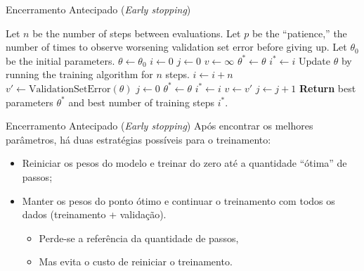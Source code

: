 \documentclass{beamer}
\begin{document}
\begin{frame}{Encerramento Antecipado (\textit{Early stopping})}
\begin{algorithm}[H]
\tiny
\begin{algorithmic}[1]
\STATE Let $n$ be the number of steps between evaluations.
\STATE Let $p$ be the ``patience,'' the number of times to observe worsening validation set error before giving up.
\STATE Let $\theta_0$ be the initial parameters.
\STATE $\theta \leftarrow \theta_0$
\STATE $i \leftarrow 0$
\STATE $j \leftarrow 0$
\STATE $v \leftarrow \infty$
\STATE $\theta^\ast \leftarrow \theta$
\STATE $i^\ast \leftarrow i$
    \STATE Update $\theta$ by running the training algorithm for $n$ steps.
    \STATE $i \leftarrow i + n$
    \STATE $v' \leftarrow \text{ValidationSetError}(\theta)$
        \STATE $j \leftarrow 0$
        \STATE $\theta^\ast \leftarrow \theta$
        \STATE $i^\ast \leftarrow i$
        \STATE $v \leftarrow v'$
    \ELSE
        \STATE $j \leftarrow j + 1$
    \ENDIF
\ENDWHILE
\STATE \textbf{Return} best parameters $\theta^\ast$ and best number of training steps $i^\ast$.
\end{algorithmic}
\end{algorithm}
\end{frame}


\begin{frame}{Encerramento Antecipado (\textit{Early stopping})}
  Após encontrar os melhores parâmetros, há duas estratégias possíveis para o treinamento:
  \begin{itemize}
    \item Reiniciar os pesos do modelo e treinar do zero até a quantidade ``ótima'' de passos;
    \item Manter os pesos do ponto ótimo e continuar o treinamento com todos os dados (treinamento + validação).
    \begin{itemize}
        \item Perde-se a referência da quantidade de passos,
        \item Mas evita o custo de reiniciar o treinamento.
    \end{itemize}
  \end{itemize}
\end{frame}
\end{document}
